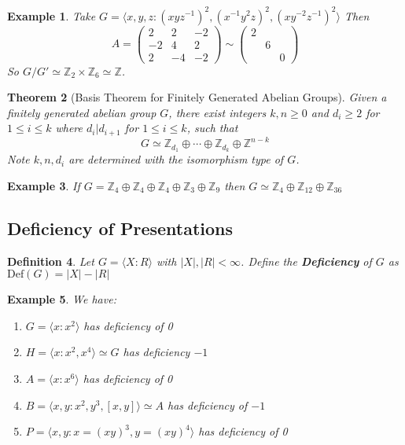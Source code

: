 \documentclass[a4paper,10pt]{article}
\newcommand{\ZZ}{\mathbb{Z}}
\newtheorem{thm}{Theorem}
\newtheorem{Def}[thm]{Definition}
\newtheorem{eg}[thm]{Example}
\begin{document}
\begin{eg}
Take $G = \langle x,y,z : (xyz^{-1})^2, (x^{-1}y^2z)^2, (xy^{-2}z^{-1})^2 \rangle$ Then 
\[ A = \begin{pmatrix} 2 & 2 & -2 \\ -2 & 4 & 2 \\ 2 & -4 & -2 \end{pmatrix} \sim \begin{pmatrix} 2 \\ & 6 \\ & & 0 \end{pmatrix} \]
So $G / G' \simeq \ZZ_2 \times \ZZ_6 \simeq \ZZ$. 
\end{eg}

\begin{thm}[Basis Theorem for Finitely Generated Abelian Groups]
Given a finitely generated abelian group $G$, there exist integers $k,n \geq 0$ and $d_i \geq 2$ for $1 \leq i \leq k$ where $d_i | d_{i+1}$ for $1 \leq i \leq k$, such that 
\[ G \simeq \ZZ_{d_1} \oplus \cdots \oplus \ZZ_{d_k} \oplus \ZZ^{n - k} \]
Note $k,n,d_i$ are determined with the isomorphism type of $G$.
\end{thm}

\begin{eg}
If $G = \ZZ_4 \oplus \ZZ_4 \oplus \ZZ_4 \oplus \ZZ_3 \oplus \ZZ_9$ then $G \simeq \ZZ_4 \oplus \ZZ_{12} \oplus \ZZ_{36}$ 
\end{eg}

\subsection{Deficiency of Presentations}

\begin{Def}
Let $G = \langle X : R \rangle$ with $|X|, |R| < \infty$. Define the \textbf{Deficiency} of $G$ as $\text{Def}(G) = |X| - |R|$
\end{Def}

\begin{eg}
We have:
\begin{enumerate}
\item $G = \langle x : x^2 \rangle$ has deficiency of 0
\item $H = \langle x : x^2, x^4 \rangle \simeq G$ has deficiency $-1$ 
\item $A = \langle x : x^6 \rangle$ has deficiency of 0
\item $B = \langle x, y : x^2, y^3, [x,y]\rangle \simeq A$ has deficiency of $-1$
\item $P = \langle x,y : x = (xy)^3, y = (xy)^4 \rangle$ has deficiency of 0
\end{enumerate}
\end{eg}
\end{document}
